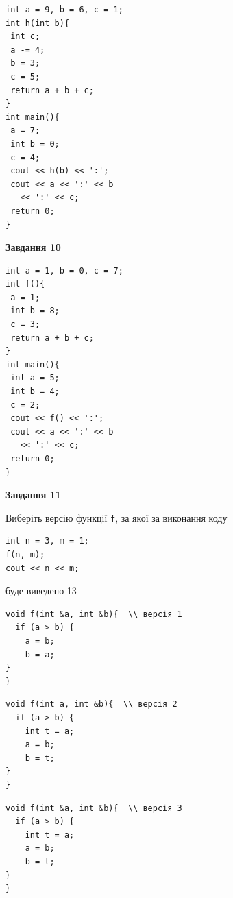 \documentclass[12pt, ukrainian]{article}
\def\code#1{\Verb!#1!}
\begin{document}
{\begin {large}
\begin{minipage}[t]{7.0cm}
\begin{verbatim}
int a = 9, b = 6, c = 1;
int h(int b){
 int c;
 a -= 4;
 b = 3;
 c = 5;
 return a + b + c;
}
int main(){
 a = 7;
 int b = 0;
 c = 4;
 cout << h(b) << ':';
 cout << a << ':' << b 
   << ':' << c;
 return 0;
}
\end{verbatim}



\begin{center}
\textbf{Завдання 10}
\end{center}
\vspace{-8mm}

\begin{verbatim}
int a = 1, b = 0, c = 7;
int f(){
 a = 1;
 int b = 8;
 c = 3;
 return a + b + c;
}
int main(){
 int a = 5;
 int b = 4;
 c = 2;
 cout << f() << ':';
 cout << a << ':' << b 
   << ':' << c;
 return 0;
}
\end{verbatim}

\end{minipage}
\vline \hspace{1mm}
\begin{minipage}[t]{11.0cm}

\begin{center}
\textbf{Завдання 11}
\end{center}
Виберіть версію функції \code{f}, за якої за виконання коду
\begin{verbatim}
int n = 3, m = 1;
f(n, m);
cout << n << m;
\end{verbatim}

буде виведено 13

\begin{verbatim}
void f(int &a, int &b){  \\ версія 1
  if (a > b) {
    a = b;
    b = a;
}  
}
\end{verbatim}

\vspace{-8mm}\begin{verbatim}
void f(int a, int &b){  \\ версія 2
  if (a > b) {
    int t = a;
    a = b;
    b = t;
}  
}
\end{verbatim}

\vspace{-8mm}\begin{verbatim}
void f(int &a, int &b){  \\ версія 3
  if (a > b) {
    int t = a;
    a = b;
    b = t;
}  
}
\end{verbatim}


\end{minipage}
\end{large}}
\end{document}
